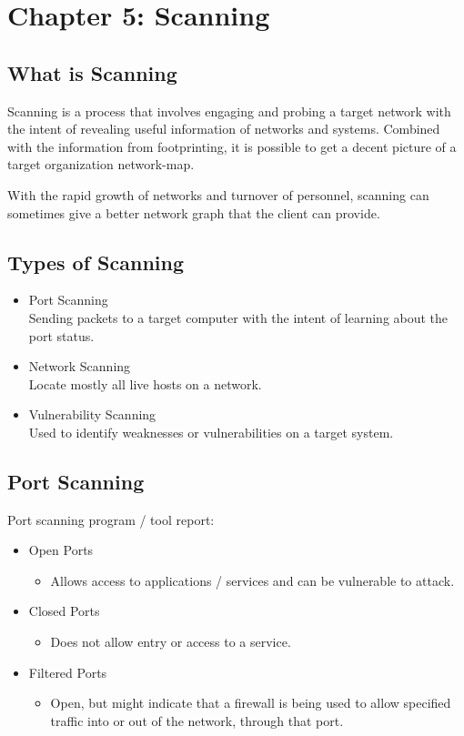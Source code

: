 \section{Chapter 5: Scanning}
\subsection{What is Scanning}

Scanning is a process that involves engaging and probing a target network with the intent of revealing useful information of networks and systems.
Combined with the information from footprinting, it is possible to get a decent picture of a target organization network-map.

With the rapid growth of networks and turnover of personnel, scanning can sometimes give a better network graph that the client can provide.


\subsection{Types of Scanning}
\begin{itemize}
    \item Port Scanning\\
        Sending packets to a target computer with the intent of learning about the port status.
    \item Network Scanning\\
        Locate mostly all live hosts on a network.
    \item Vulnerability Scanning\\
        Used to identify weaknesses or vulnerabilities on a target system.
\end{itemize}
\subsection{Port Scanning}

Port scanning program / tool report:
\begin{itemize}
    \item Open Ports
    \begin{itemize}
        \item Allows access to applications / services and can be vulnerable to attack.
    \end{itemize}
    \item Closed Ports
    \begin{itemize}
        \item Does not allow entry or access to a service.
    \end{itemize}
    \item Filtered Ports
    \begin{itemize}
        \item Open, but might indicate that a firewall is being used to allow specified traffic into or out of the network, through that port.
    \end{itemize}
\end{itemize}

